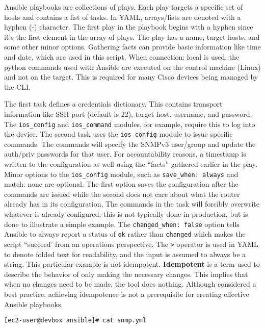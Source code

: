 Ansible playbooks are collections of plays. Each play targets a specific set
of hosts and contains a list of tasks. In YAML, arrays/lists are denoted with
a hyphen (-) character. The first play in the playbook begins with a hyphen
since it’s the first element in the array of plays. The play has a name,
target hosts, and some other minor options. Gathering facts can provide basic
information like time and date, which are used in this script. When
connection: local is used, the python commands used with Ansible are executed
on the control machine (Linux) and not on the target. This is required for
many Cisco devices being managed by the CLI\@.

The first task defines a credentials dictionary. This contains transport
information like SSH port (default is 22), target host, username, and
password. The \verb|ios_config| and \verb|ios_command| modules, for example,
require this to log into the device. The second task uses the
\verb|ios_config| module to issue specific commands. The commands will specify
the SNMPv3 user/group and update the auth/priv passwords for that user. For
accountability reasons, a timestamp is written to the configuration as well
using the ``facts'' gathered earlier in the play. Minor options to the
\verb|ios_config| module, such as \verb|save_when: always| and match: none are
optional. The first option saves the configuration after the commands are
issued while the second does not care about what the router already has in its
configuration. The commands in the task will forcibly overwrite whatever is
already configured; this is not typically done in production, but is done to
illustrate a simple example. The \verb|changed_when: false| option tells
Ansible to always report a status of \verb|ok| rather than \verb|changed|
which makes the script ``succeed' from an operations perspective. The \verb|>|
operator is used in YAML to denote folded text for readability, and the input
is assumed to always be a string. This particular example is not idempotent.
\textbf{Idempotent} is a term used to describe the behavior of only making the
necessary changes. This implies that when no changes need to be made, the tool
does nothing. Although considered a best practice, achieving idempotence is
not a prerequisite for creating effective Ansible playbooks.

\begin{verbatim}
[ec2-user@devbox ansible]# cat snmp.yml 
\end{verbatim}

